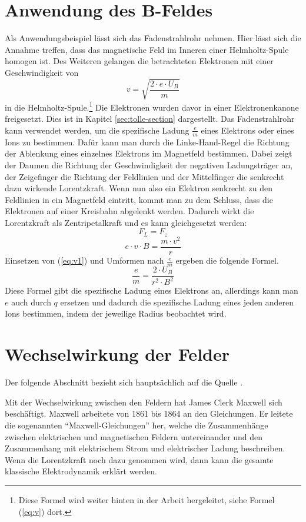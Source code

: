 \section{Anwendung des B-Feldes}
\label{sec:Fadenstrahlrohr}
Als Anwendungsbeispiel lässt sich das Fadenstrahlrohr nehmen.
Hier lässt sich die Annahme treffen, dass das magnetische Feld im Inneren einer Helmholtz-Spule homogen ist. Des Weiteren gelangen die betrachteten Elektronen mit einer Geschwindigkeit von 
\begin{equation}
\label{eq:v1}
    v=\sqrt{\frac{2 \cdot e \cdot U_B}{m}}
\end{equation}
in die Helmholtz-Spule.\footnote{Diese Formel wird weiter hinten in der Arbeit hergeleitet, siehe Formel (\ref{eq:v}) dort.}
Die Elektronen wurden davor in einer Elektronenkanone freigesetzt.
Dies ist in Kapitel \ref{sec:tolle-section} dargestellt. 
Das Fadenstrahlrohr kann verwendet werden, um die spezifische Ladung $\frac{e}{m}$ eines Elektrons oder eines Ions zu bestimmen.
Dafür kann man durch die Linke-Hand-Regel die Richtung der Ablenkung eines einzelnes Elektrons im Magnetfeld bestimmen.
Dabei zeigt der Daumen die Richtung der Geschwindigkeit der negativen Ladungsträger an, der Zeigefinger die Richtung der Feldlinien und der Mittelfinger die senkrecht dazu wirkende Lorentzkraft.
Wenn nun also ein Elektron senkrecht zu den Feldlinien in ein Magnetfeld eintritt, kommt man zu dem Schluss, dass die Elektronen auf einer Kreisbahn abgelenkt werden. 
Dadurch wirkt die Lorentzkraft als Zentripetalkraft und es kann gleichgesetzt werden:
$$F_L = F_z$$
$$e \cdot v \cdot B = \frac{m \cdot v^2}{r}$$
Einsetzen von (\ref{eq:v1}) und  Umformen nach $\frac{e}{m}$ ergeben die folgende Formel.
\begin{equation*}
    \frac{e}{m} = \frac{2 \cdot U_B}{ r^2 \cdot B^2}
\end{equation*}
Diese Formel gibt die spezifische Ladung eines Elektrons an, allerdings kann man $e$ auch durch $q$ ersetzen und dadurch die spezifische Ladung eines jeden anderen Ions bestimmen, indem der jeweilige Radius beobachtet wird.
\section{Wechselwirkung der Felder}%
\label{sec:Maxwell}
Der folgende Abschnitt bezieht sich hauptsächlich auf die Quelle \cite{Maxwell}.

Mit der Wechselwirkung zwischen den Feldern hat James Clerk Maxwell sich
beschäftigt.
Maxwell arbeitete von 1861 bis 1864 an den Gleichungen.
Er leitete die sogenannten "`Maxwell-Gleichungen"' her, welche die Zusammenhänge zwischen elektrischen und magnetischen Feldern untereinander und den Zusammenhang mit elektrischem Strom und elektrischer Ladung beschreiben.
Wenn die Lorentzkraft noch dazu genommen wird, dann kann die gesamte klassische Elektrodynamik erklärt werden.


